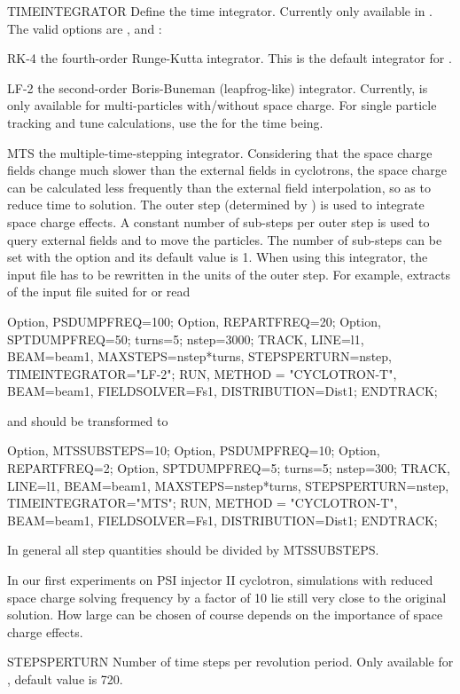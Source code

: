 \begin{kdescription}
 \item[TIMEINTEGRATOR]
  Define the time integrator. Currently only available in \opalcycl.
  The valid options are ,  and :
  \begin{kdescription}
    \item[RK-4] the fourth-order Runge-Kutta integrator. This is the default integrator for \opalcycl.
    \item[LF-2] the second-order Boris-Buneman (leapfrog-like) integrator.
      Currently,  is only available for multi-particles with/without space charge.
      For single particle tracking and tune calculations, use the  for the time being.
    \item[MTS] the multiple-time-stepping integrator.
    Considering that the space charge fields change much slower than the external fields in cyclotrons,
    the space charge can be calculated less  frequently than the external field interpolation, so as to reduce time to solution.
    The outer step (determined by ) is used to integrate  space charge effects.
    A constant number of sub-steps per outer step is used to query external fields and to move the particles.
    The number of sub-steps can be set with the option  and its default value is 1.
    When using this integrator, the input file has to be rewritten in the units of the outer step.
   For example, extracts of the input file suited for
     or  read
\begin{example}
Option, PSDUMPFREQ=100;
Option, REPARTFREQ=20;
Option, SPTDUMPFREQ=50;
turns=5;
nstep=3000;
TRACK, LINE=l1, BEAM=beam1, MAXSTEPS=nstep*turns, STEPSPERTURN=nstep,
TIMEINTEGRATOR="LF-2";
    RUN, METHOD = "CYCLOTRON-T", BEAM=beam1, FIELDSOLVER=Fs1, DISTRIBUTION=Dist1;
ENDTRACK;
\end{example}
and should be transformed to
\begin{example}
Option, MTSSUBSTEPS=10;
Option, PSDUMPFREQ=10;
Option, REPARTFREQ=2;
Option, SPTDUMPFREQ=5;
turns=5;
nstep=300;
TRACK, LINE=l1, BEAM=beam1, MAXSTEPS=nstep*turns, STEPSPERTURN=nstep,
TIMEINTEGRATOR="MTS";
    RUN, METHOD = "CYCLOTRON-T", BEAM=beam1, FIELDSOLVER=Fs1, DISTRIBUTION=Dist1;
ENDTRACK;
\end{example}
In general all step quantities should be divided by MTSSUBSTEPS.

In our first experiments on PSI injector II cyclotron, simulations with reduced
space charge solving frequency by a factor of 10 lie still very close to the original solution.
How large  can be chosen of course depends on the importance of space charge effects.
  \end{kdescription}

\item[STEPSPERTURN]
  Number of time steps per revolution period. Only available for \opalcycl, default value is 720.

\end{kdescription}

